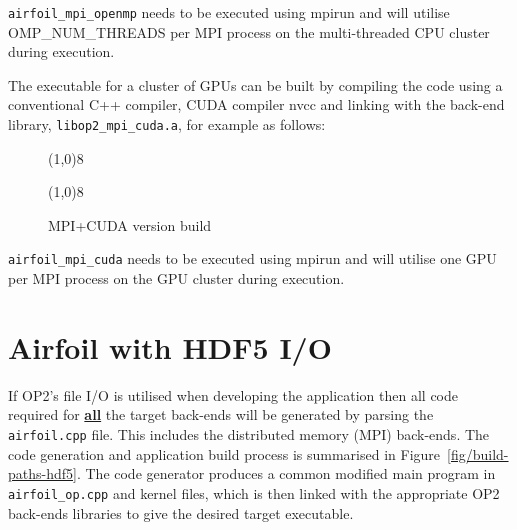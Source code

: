 \documentclass[11pt]{article}
\begin{document}
\noindent \texttt{airfoil\_mpi\_openmp} needs to be executed using mpirun and will utilise OMP\_NUM\_THREADS per MPI
process on the multi-threaded CPU cluster during execution. 

\newpage
\noindent The executable for a cluster of GPUs can be built by compiling the code using a conventional C++ compiler,
CUDA compiler nvcc and linking with the back-end library, \texttt{libop2\_mpi\_cuda.a}, for example as follows:

\begin{figure}[h]\small
\vspace{-0pt}\noindent\line(1,0){8}\vspace{-20pt}
\vspace{-10pt}\noindent\line(1,0){8}\vspace{-10pt}
\caption{\small MPI+CUDA version build }
\normalsize\vspace{-10pt}\label{fig:mpi_cudabuild}
\end{figure}

\noindent \texttt{airfoil\_mpi\_cuda} needs to be executed using mpirun and will utilise one GPU per MPI process on the
GPU cluster during execution. 

\newpage
\section{Airfoil with HDF5 I/O}\label{hdf5}
If OP2's file I/O is utilised when developing the application then all code required for \underline{\textbf{all}} the
target back-ends will be generated by parsing the \texttt{airfoil.cpp} file. This includes the distributed memory (MPI)
back-ends. The code generation and application build process is summarised in Figure~\ref{fig/build-paths-hdf5}. The
code generator produces a common modified main program in \texttt{airfoil\_op.cpp} and kernel files, which is then
linked with the appropriate OP2 back-ends libraries to give the desired target executable. 
\end{document}
